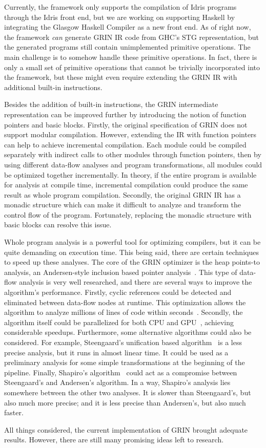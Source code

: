 \documentclass[main.tex]{subfiles}
\begin{document}
	
	Currently, the framework only supports the compilation of Idris programs through the Idris front end, but we are working on supporting Haskell by integrating the Glasgow Haskell Compiler as a new front end. As of right now, the framework \emph{can} generate GRIN IR code from GHC's STG representation, but the generated programs still contain unimplemented primitive operations. The main challenge is to somehow handle these primitive operations. In fact, there is only a small set of primitive operations that cannot be trivially incorporated into the framework, but these might even require extending the GRIN IR with additional built-in instructions.
	
	Besides the addition of built-in instructions, the GRIN intermediate representation can be improved further by introducing the notion of function pointers and basic blocks. Firstly, the original specification of GRIN does not support modular compilation. However, extending the IR with function pointers can help to achieve incremental compilation. Each module could be compiled separately with indirect calls to other modules through function pointers, then by using different data-flow analyses and program transformations, all modules could be optimized together incrementally. In theory, if the entire program is available for analysis at compile time, incremental compilation could produce the same result as whole program compilation. Secondly, the original GRIN IR has a monadic structure which can make it difficult to analyze and transform the control flow of the program. Fortunately, replacing the monadic structure with basic blocks can resolve this issue.
	
  Whole program analysis is a powerful tool for optimizing compilers, but it can be quite demanding on execution time. This being said, there are certain techniques to speed up these analyses. The core of the GRIN optimizer is the heap points-to analysis, an Andersen-style inclusion based pointer analysis~\cite{andersen-ptr}. This type of data-flow analysis is very well researched, and there are several ways to improve the algorithm's performance. Firstly, cyclic references could be detected and eliminated between data-flow nodes at runtime. This optimization allows the algorithm to analyze millions of lines of code within seconds~\cite{andersen-opt}. Secondly, the algorithm itself could be parallelized for both CPU and GPU~\cite{andersen-gpu}, achieving considerable speedups. Furthermore, some alternative algorithms could also be considered. For example, Steengaard's unification based algorithm~\cite{steensgaard-ptr} is a less precise analysis, but it runs in almost linear time. It could be used as a preliminary analysis for some simple transformations at the beginning of the pipeline. Finally, Shapiro's algorithm~\cite{shapiro-ptr} could act as a compromise between Steengaard's and Andersen's algorithm. In a way, Shapiro's analysis lies somewhere between the other two analyses. It is slower than Steengaard's, but also much more precise; and it is less precise than Andersen's, but also much faster.
  
  All things considered, the current implementation of GRIN brought adequate results. However, there are still many promising ideas left to research.
	
\end{document}
